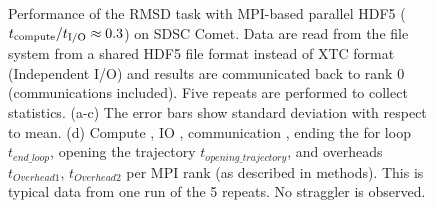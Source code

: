 \begin{figure}[ht!]
\begin{subfigure} {.5\textwidth}
  \label{fig:MPIranks-hdf5}
\end{subfigure}
%
\caption{Performance of the RMSD task with MPI-based parallel HDF5 (${t}_{\text{compute}}/{t}_{\text{I/O}} \approx 0.3$) on SDSC Comet.
Data are read from the file system from a shared HDF5 file format instead of XTC format (Independent I/O) and results are communicated back to rank 0 (communications included). 
Five repeats are performed to collect statistics. (a-c) The error bars show standard deviation with respect to mean. (d) Compute \tcomp, IO \tIO, communication \tcomm, ending the for loop $t_{end\_loop}$,
  opening the trajectory $t_{opening\_trajectory}$, and overheads $t_{Overhead1}$,  $t_{Overhead2}$ per MPI rank (as described in methods).
  This is typical data from one run of the 5 repeats. No straggler is observed.}
\label{fig:MPIwithIO-hdf5}
\end{figure}
